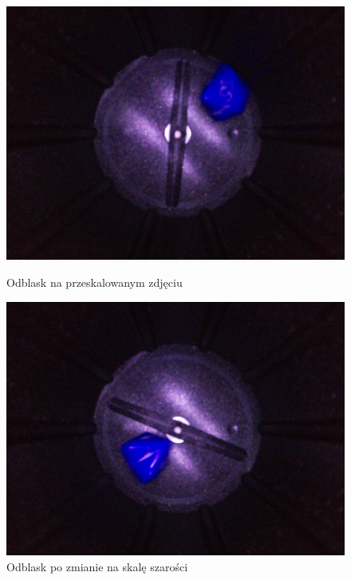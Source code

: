 \begin{figure}[H]
    \centering
    \begin{minipage}[t]{0.45\linewidth}
        \centering
        \includegraphics[width=\linewidth]{chapters/04-czytanie/figures/wir}
        \caption{Odblask na przeskalowanym zdjęciu}
        \label{fig:wir}
    \end{minipage}
    \hfill
    \begin{minipage}[t]{0.45\linewidth}
        \centering
        \includegraphics[width=\linewidth]{chapters/04-czytanie/figures/wir2}
        \caption{Odblask po zmianie na skalę szarości}
        \label{fig:wir2}
    \end{minipage}
\end{figure}

